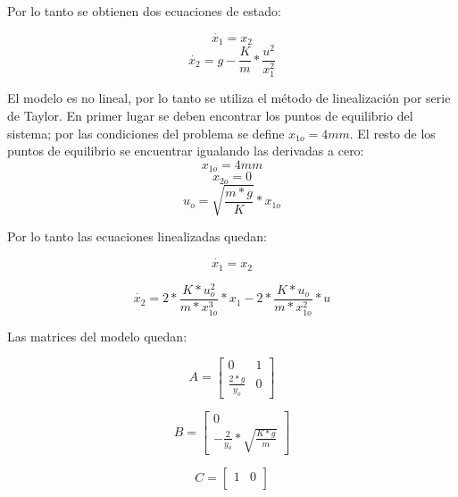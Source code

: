 \noindent Por lo tanto se obtienen dos ecuaciones de estado:

\begin{equation}
	\dot{x_{1}}=x_{2}
\end{equation}
\begin{equation}
	\dot{x_{2}}=g-\frac{K}{m}*\frac{u^{2}}{x_{1}^{2}}
\end{equation}

El modelo es no lineal, por lo tanto se utiliza el método de linealización por serie de Taylor. En primer lugar se deben encontrar los puntos de equilibrio del sistema; por las condiciones del problema se define $x_{1o}=4mm$. El resto de los puntos de equilibrio se encuentrar igualando las derivadas a cero:
\begin{equation}
	x_{1o}=4mm
\end{equation}
\begin{equation}
	x_{2o}=0
\end{equation}
\begin{equation}
	u_{o}=\sqrt{\frac{m*g}{K}}*x_{1o}
\end{equation}

Por lo tanto las ecuaciones linealizadas quedan:

\begin{equation}
	\dot{x_{1}}=x_{2}
\end{equation}

\begin{equation}
	\dot{x_{2}}=2*\frac{K*u_{o}^{2}}{m*x_{1o}^{3}}*x_{1}-2*\frac{K*u_{o}}{m*x_{1o}^{2}}*u
\end{equation}

Las matrices del modelo quedan:

\begin{equation}
	A=\begin{bmatrix}
		0 & 1\\
		\frac{2*g}{y_{o}} & 0
	\end{bmatrix}
\end{equation}

\begin{equation}
	B=\begin{bmatrix}
		0\\
		-\frac{2}{y_{o}}*\sqrt{\frac{K*g}{m}}
	\end{bmatrix}
\end{equation}

\begin{equation}
	C=\begin{bmatrix}
		1 & 0\\
	\end{bmatrix}
\end{equation}

